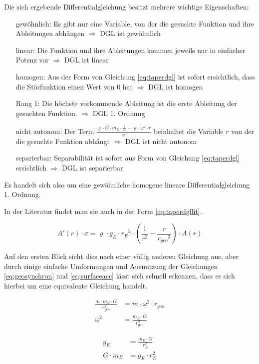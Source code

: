 \documentclass[a4paper, 10pt]{report}
\begin{document}
Die sich ergebende Differentialgleichung besitzt mehrere wichtige Eigenschaften:
\begin{itemize}
\item[gewöhnlich:] Es gibt nur eine Variable, von der die gesuchte Funktion und ihre Ableitungen abhängen $\Rightarrow$ DGL ist gewöhnlich
\item[linear:] Die Funktion und ihre Ableitungen kommen jeweils nur in einfacher Potenz vor $\Rightarrow$ DGL ist linear
\item[homogen:] Aus der Form von Gleichung \ref{eq:taperdgl} ist sofort ersichtlich, dass die Störfunktion einen Wert von 0 hat $\Rightarrow$ DGL ist homogen
\item[Rang 1:] Die höchste vorkommende Ableitung ist die erste Ableitung der gesuchten Funktion. $\Rightarrow$ DGL 1. Ordnung
\item[nicht autonom:] Der Term $\frac{\varrho \cdot G \cdot m_E \cdot \frac{1}{r^2} - \varrho \cdot \omega^2 \cdot r}{\sigma}$ beinhaltet die Variable $r$ von der die gesuchte Funktion abhängt $\Rightarrow$ DGL ist nicht autonom
\item[separierbar:] Separabilität ist sofort aus Form von Gleichung \ref{eq:taperdgl} ersichtlich $\Rightarrow$ DGL ist separierbar
\end{itemize}
Es handelt sich also um eine gewöhnliche homogene lineare Differentialgleichung 1. Ordnung.

In der Literatur\cite{PE75} findet man sie auch in der Form \ref{eq:taperdgllit}.

\begin{equation}
A'(r) \cdot \sigma = \varrho \cdot g_E \cdot {r_E}^2 \cdot (\frac{1}{r^2} - \frac{r}{{r_{geo}}^3}) \cdot A(r)
\label{eq:taperdgllit}
\end{equation}

Auf den ersten Blick sieht dies nach einer völlig anderen Gleichung aus, aber durch einige einfache Umformungen und Ausnutzung der Gleichungen \ref{eq:geosynchron} und \ref{eq:surfaceacc} lässt sich schnell erkennen, dass es sich hierbei um eine equivalente Gleichung handelt.

\begin{align}
\frac{m \cdot m_E \cdot G}{r_{geo}^2} &= m \cdot \omega^2 \cdot r_{geo}\nonumber \\
\omega^2 &= \frac{m_E \cdot G}{r_{geo}^3}
\label{eq:geosynchron}
\end{align}

\begin{align}
g_E &= \frac{m_E \cdot G}{r_E^2} \nonumber \\
G \cdot m_E &= g_E \cdot r_E^2
\label{eq:surfaceacc}
\end{align}
\end{document}
